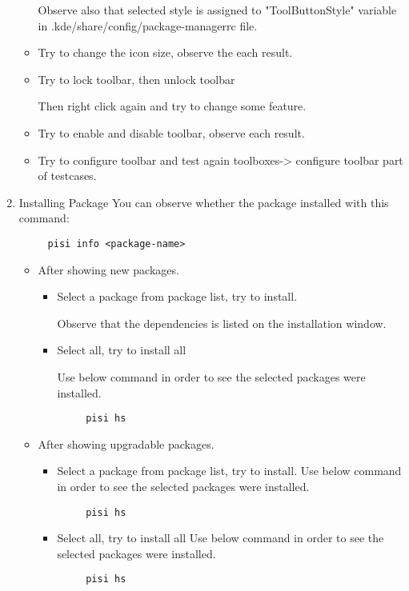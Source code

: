 \documentclass[a4paper,10pt]{article}
\begin{document}
\begin{enumerate}
\begin{itemize}
            Observe also that selected style is assigned to "ToolButtonStyle" variable in .kde/share/config/package-managerrc file.
        \item Try to change the icon size, observe the each result.
        \item Try to lock toolbar, then unlock toolbar
    
            Then right click again and try to change some feature.
        \item Try to enable and disable toolbar, observe each result.
        \item Try to configure toolbar and test again toolboxes-> configure toolbar part of testcases.
    \end{itemize}
    \item Installing Package
	You can observe whether the package installed with this command:
	\begin{verbatim}
	 pisi info <package-name>
	\end{verbatim}

        \begin{itemize}
            \item After showing new packages. 
            \begin{itemize}
                \item Select a package from package list, try to install.

                Observe that the dependencies is listed on the installation window.

                \item Select all, try to install all

Use below command in order to see the selected packages were installed.
	\begin{verbatim}
	 pisi hs
	\end{verbatim}
                
            \end{itemize}
            \item After showing upgradable packages.
            \begin{itemize}
                \item Select a package from package list, try to install.
Use below command in order to see the selected packages were installed.
	\begin{verbatim}
	 pisi hs
	\end{verbatim}
                \item Select all, try to install all
Use below command in order to see the selected packages were installed.
	\begin{verbatim}
	 pisi hs
	\end{verbatim}
            \end{itemize}


\end{itemize}
\end{enumerate}
\end{document}
